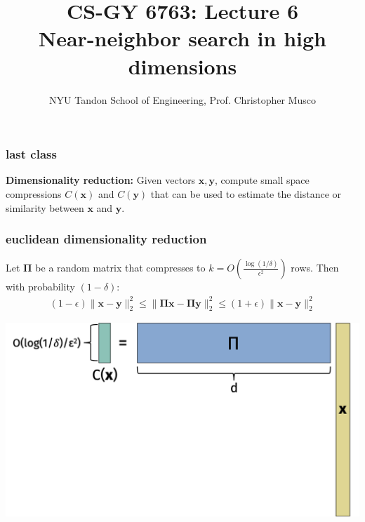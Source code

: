 \documentclass[compress]{beamer}
\title{CS-GY 6763: Lecture 6 \\ Near-neighbor search in high dimensions}
\author{NYU Tandon School of Engineering, Prof. Christopher Musco}
\date{}
\newcommand{\bs}[1]{\boldsymbol{#1}}
\newcommand{\bv}[1]{\mathbf{#1}}
\begin{document}
\begin{frame}
	\titlepage 
\end{frame}



\begin{frame}
	\frametitle{last class}
	\textbf{Dimensionality reduction:} Given vectors $\bv{x}, \bv{y}$, compute small space compressions $C(\bv{x})$ and $C(\bv{y})$ that can be used to estimate the distance or similarity between $\bv{x}$ and $\bv{y}$. 
\end{frame}

\begin{frame}
	\frametitle{euclidean dimensionality reduction}
	\begin{lemma}
		Let $\bs{\Pi}$ be a random matrix that compresses to $k = O\left(\frac{\log(1/\delta)}{\epsilon^2}\right)$ rows. Then with probability $(1-\delta)$:
		\begin{align*}
			(1-\epsilon)\|\bv{x} - \bv{y}\|_2^2 \leq \|\bs{\Pi}\bv{x} - \bs{\Pi}\bv{y}\|_2^2 \leq (1+\epsilon) \|\bv{x} - \bv{y}\|_2^2
		\end{align*}
	\end{lemma}
	
	\begin{center}
		\includegraphics[height=.55\textheight]{jl_refresh.png}
	\end{center}
\end{frame}
\end{document}
